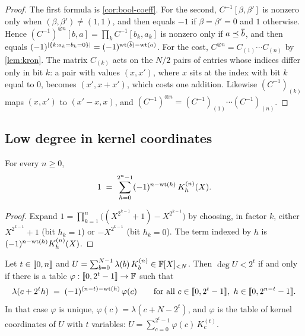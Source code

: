 \begin{proof}
The first formula is \cref{cor:bool-coeff}.
For the second, $C^{-1}[\beta,\beta']$ is nonzero only when $(\beta,\beta') \ne (1,1)$, and then equals $-1$ if $\beta = \beta' = 0$ and $1$ otherwise.
Hence $(C^{-1})^{\otimes n}[b,a] = \prod_k C^{-1}[b_k,a_k]$ is nonzero only if $a \preceq \overline{b}$, and then equals $(-1)^{|\{k : a_k = b_k = 0\}|} = (-1)^{\mathrm{wt}(\overline{b}) - \mathrm{wt}(a)}$.
For the cost, $C^{\otimes n} = C_{(1)} \cdots C_{(n)}$ by \cref{lem:kron}.
The matrix $C_{(k)}$ acts on the $N/2$ pairs of entries whose indices differ only in bit $k$: a pair with values $(x, x')$, where $x$ sits at the index with bit $k$ equal to $0$, becomes $(x', x + x')$, which costs one addition.
Likewise $(C^{-1})_{(k)}$ maps $(x,x')$ to $(x' - x, x)$, and $(C^{-1})^{\otimes n} = (C^{-1})_{(1)}\cdots (C^{-1})_{(n)}$.
\end{proof}

\subsection{Low degree in kernel coordinates}\label{sec:kernel:lowdeg}

\begin{lemma}\label{lem:one}
For every $n \ge 0$,
\[
  1 \;=\; \sum_{h=0}^{2^n-1} (-1)^{n - \mathrm{wt}(h)}\, K^{(n)}_h(X).
\]
\end{lemma}

\begin{proof}
Expand $1 = \prod_{k=1}^{n}\bigl( (X^{2^{k-1}} + 1) - X^{2^{k-1}} \bigr)$ by choosing, in factor $k$, either $X^{2^{k-1}}+1$ (bit $h_k = 1$) or $-X^{2^{k-1}}$ (bit $h_k = 0$). The term indexed by $h$ is $(-1)^{n-\mathrm{wt}(h)} K^{(n)}_h(X)$.
\end{proof}

\begin{theorem}\label{thm:lowdeg}
Let $t \in \llbracket 0, n \rrbracket$ and $U = \sum_{b=0}^{N-1} \lambda(b)\, K^{(n)}_b \in \mathbb{F}[X]_{<N}$.
Then $\deg U < 2^t$ if and only if there is a table $\varphi : \llbracket 0, 2^t-1 \rrbracket \to \mathbb{F}$ such that
\begin{equation}\label{eq:character}
  \lambda(c + 2^t h) \;=\; (-1)^{(n-t) - \mathrm{wt}(h)}\, \varphi(c)
  \qquad \text{for all } c \in \llbracket 0, 2^t-1 \rrbracket,\ h \in \llbracket 0, 2^{n-t}-1 \rrbracket.
\end{equation}
In that case $\varphi$ is unique, $\varphi(c) = \lambda(c + N - 2^t)$, and $\varphi$ is the table of kernel coordinates of $U$ with $t$ variables: $U = \sum_{c=0}^{2^t-1} \varphi(c)\, K^{(t)}_c$.
\end{theorem}

